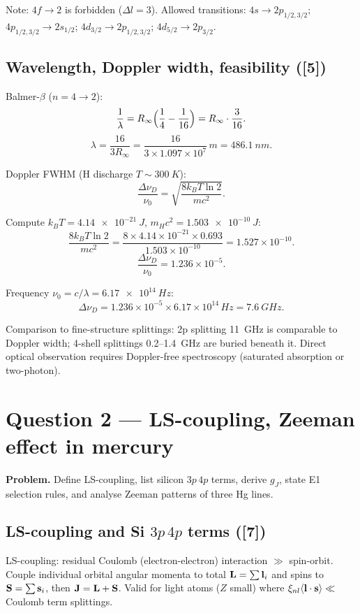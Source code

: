 \documentclass[11pt]{article}
\begin{document}
Note: $4f\to 2$ is forbidden ($\Delta l = 3$). Allowed transitions:
$4s\to 2p_{1/2,3/2}$; $4p_{1/2,3/2}\to 2s_{1/2}$; $4d_{3/2}\to 2p_{1/2,3/2}$;
$4d_{5/2}\to 2p_{3/2}$.

\subsection*{Wavelength, Doppler width, feasibility ([5])}

Balmer-$\beta$ ($n=4\to 2$):
\[
\frac{1}{\lambda} = R_\infty\Bigl(\frac{1}{4} - \frac{1}{16}\Bigr) = R_\infty \cdot \frac{3}{16}.
\]
\[
\lambda = \frac{16}{3 R_\infty} = \frac{16}{3\times 1.097\times 10^7}\,\si{m} = \boxed{\SI{486.1}{nm}}.
\]

Doppler FWHM (H discharge $T\sim\SI{300}{K}$):
\[
\frac{\Delta\nu_D}{\nu_0} = \sqrt{\frac{8 k_B T \ln 2}{m c^2}}.
\]

Compute $k_B T = \SI{4.14e-21}{J}$, $m_H c^2 = \SI{1.503e-10}{J}$:
\[
\frac{8 k_B T\ln 2}{m c^2} = \frac{8\times 4.14\times 10^{-21}\times 0.693}{1.503\times 10^{-10}} = 1.527\times 10^{-10}.
\]
\[
\frac{\Delta\nu_D}{\nu_0} = 1.236\times 10^{-5}.
\]

Frequency $\nu_0 = c/\lambda = \SI{6.17e14}{Hz}$:
\[
\Delta\nu_D = 1.236\times 10^{-5}\times 6.17\times 10^{14}\,\si{Hz} = \boxed{\SI{7.6}{GHz}}.
\]

Comparison to fine-structure splittings: 2p splitting \SI{11}{GHz} is comparable to
Doppler width; 4-shell splittings \SI{0.2}{}--\SI{1.4}{GHz} are buried beneath it.
Direct optical observation requires Doppler-free spectroscopy (saturated absorption
or two-photon).

\section*{Question 2 --- LS-coupling, Zeeman effect in mercury}

\textbf{Problem.} Define LS-coupling, list silicon $3p\,4p$ terms, derive $g_J$,
state E1 selection rules, and analyse Zeeman patterns of three Hg lines.

\subsection*{LS-coupling and Si $3p\,4p$ terms ([7])}

LS-coupling: residual Coulomb (electron-electron) interaction $\gg$ spin-orbit.
Couple individual orbital angular momenta to total $\vb L = \sum\vb l_i$ and spins
to $\vb S=\sum\vb s_i$, then $\vb J = \vb L+\vb S$. Valid for light atoms ($Z$ small)
where $\xi_{nl}\langle\vb l\cdot\vb s\rangle\ll$ Coulomb term splittings.
\end{document}
